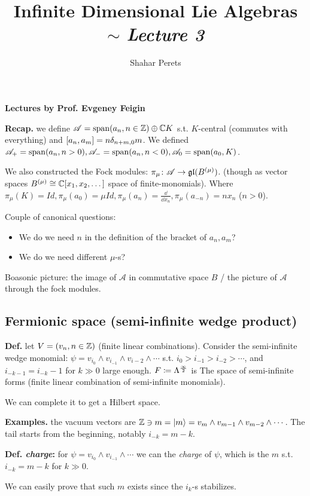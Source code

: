 \documentclass[]{../../../../tex/classes/styledArticle}
\author{Shahar Perets}
\title{Infinite Dimensional Lie Algebras $\sim$ \textit{Lecture 3}}
\newcommand\gl {\mathfrak{gl}}
\newcommand\asc{\mathscr{A}}
\newcommand\sinf{\frac{\inft}{2}}
\begin{document}
	\maketitle
	
	\textbf{Lectures by Prof. Evgeney Feigin}
	
	\textbf{Recap. }we define $\asc = \Sp(a_n, n \in \Z) \oplus \C K$ s.t. $K$-central (commutes with everything) and $[a_n, a_m] = n\delta_{n + m, 0}m$. We defined $\asc_+ = \Sp(a_n, n > 0), \asc_- = \Sp(a_n, n< 0), \asc_0 = \Sp(a_0, K)$. 
	
	We also constructed the Fock modules: $\pi_\mu \co \asc \to \gl(B^{(\mu)})$. (though as vector spaces $B^{(\mu)} \cong \mathbb{C}[x_1, x_2, \dots ]$ space of finite-monomials). Where $\pi_\mu(K) = Id, \pi_\mu(a_0) = \mu Id, \pi_\mu(a_n) = \frac{\dd}{\dd x_n}, \pi_\mu(a_{-n}) = nx_n$ ($n > 0$). 
	
	Couple of canonical questions: 
	\begin{itemize}
		\item We do we need $n$ in the definition of the bracket of $a_n, a_m$? 
		\item We do we need different $\mu$-s? 
	\end{itemize}
	Boasonic picture: the image of $\asc$ in commutative space $B$ / the picture of $\asc$ through the fock modules. 
	
	\subsection{Fermionic space (semi-infinite wedge product)}
	\textbf{Def. }let $V = (v_n, n \in \mathbb{Z})$ (finite linear combinations). Consider the semi-infinite wedge monomial: $\psi = v_{i_0} \land v_{i_{-1}} \land v_{i - 2} \land \cdots$ s.t. $i_0 > i_{-1} > i_{-2} > \cdots$, and $i_{-k - 1} = i_{-k} - 1$ for $k \gg 0$ large enough. $F \cod \Lg^{\sinf}$ is The space of semi-infinite forms (finite linear combination of semi-infinite monomials). 
	
	We can complete it to get a Hilbert space. 
	
	\textbf{Examples. }the vacuum vectors are $\mathbb{Z} \ni m = |m\rangle  = v_m \land v_{m - 1} \land v_{m - 2} \land \cdots$. The tail starts from the beginning, notably $i_{-k} = m - k$. 
	
	\textbf{Def. \textit{charge}: }for $\psi = v_{i_0} \land v_{i_{- 1}} \land \cdots$ we can the \textit{charge} of $\psi$, which is the $m$ s.t. $i_{-k} = m- k$ for $k \gg 0$. 
	
	We can easily prove that such $m$ exists since the $i_k$-s stabilizes. 
	
\end{document}
